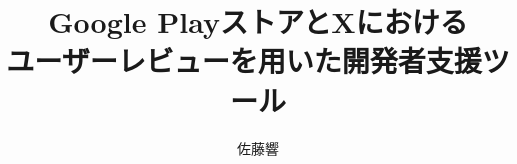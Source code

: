 \documentclass[report, a4paper, 12pt]{jsbook}
\title{Google PlayストアとXにおける\mbox{}\\ユーザーレビューを用いた開発者支援ツール}
\author{佐藤響}
\date{}
\begin{document}
\makecover    %
\makeabstract %
\maketitle    %
\maketoc      %















% 
\end{document}
